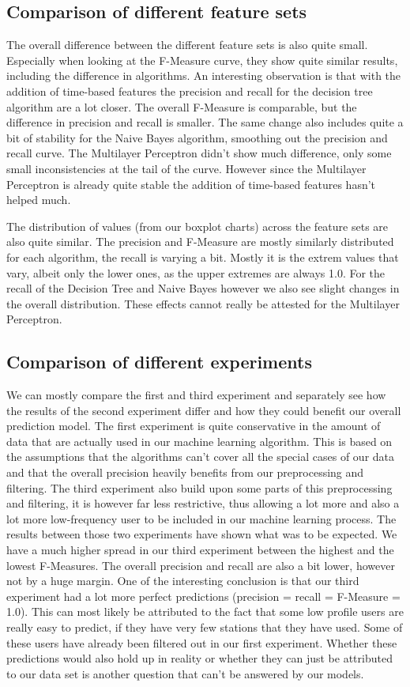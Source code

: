 \subsection{Comparison of different feature sets}
The overall difference between the different feature sets is also quite small. Especially when looking at the F-Measure curve, they show quite similar results, including the difference in algorithms. An interesting observation is that with the addition of time-based features the precision and recall for the decision tree algorithm are a lot closer. The overall F-Measure is comparable, but the difference in precision and recall is smaller. The same change also includes quite a bit of stability for the Naive Bayes algorithm, smoothing out the precision and recall curve. The Multilayer Perceptron didn't show much difference, only some small inconsistencies at the tail of the curve. However since the Multilayer Perceptron is already quite stable the addition of time-based features hasn't helped much.

The distribution of values (from our boxplot charts) across the feature sets are also quite similar. The precision and F-Measure are mostly similarly distributed for each algorithm, the recall is varying a bit. Mostly it is the extrem values that vary, albeit only the lower ones, as the upper extremes are always 1.0. For the recall of the Decision Tree and Naive Bayes however we also see slight changes in the overall distribution. These effects cannot really be attested for the Multilayer Perceptron.

\subsection{Comparison of different experiments}
We can mostly compare the first and third experiment and separately see how the results of the second experiment differ and how they could benefit our overall prediction model.
The first experiment is quite conservative in the amount of data that are actually used in our machine learning algorithm. This is based on the assumptions that the algorithms can't cover all the special cases of our data and that the overall precision heavily benefits from our preprocessing and filtering. The third experiment also build upon some parts of this preprocessing and filtering, it is however far less restrictive, thus allowing a lot more and also a lot more low-frequency user to be included in our machine learning process. The results between those two experiments have shown what was to be expected. We have a much higher spread in our third experiment between the highest and the lowest F-Measures. The overall precision and recall are also a bit lower, however not by a huge margin. One of the interesting conclusion is that our third experiment had a lot more perfect predictions (precision = recall = F-Measure = 1.0). This can most likely be attributed to the fact that some low profile users are really easy to predict, if they have very few stations that they have used. Some of these users have already been filtered out in our first experiment. Whether these predictions would also hold up in reality or whether they can just be attributed to our data set is another question that can't be answered by our models. 


